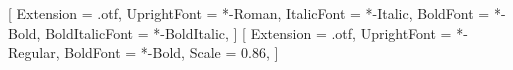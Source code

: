 \usepackage{indentfirst}
\setlength{\parindent}{1.25cm}
\setlength{\parskip}{0pt}

\setmainfont{XCharter}[
  Extension      = .otf,
  UprightFont    = *-Roman,
  ItalicFont     = *-Italic,
  BoldFont       = *-Bold,
  BoldItalicFont = *-BoldItalic,
]
\setmonofont{FiraMono}[
  Extension   = .otf,
  UprightFont = *-Regular,
  BoldFont    = *-Bold,
  Scale       = 0.86,
]


\usepackage{etoolbox}
\renewcommand{\arraystretch}{1.2}


\usepackage{fancyhdr}
\pagestyle{fancy}
\fancyhf{}
\fancyhead[L]{\nouppercase{\leftmark}}
\fancyhead[R]{\thepage}
\renewcommand{\headrulewidth}{0pt}
\renewcommand{\footrulewidth}{0pt}
\fancypagestyle{plain}{%
  \fancyhf{}
  \fancyhead[R]{\thepage}
  \renewcommand{\headrulewidth}{0pt}
}

